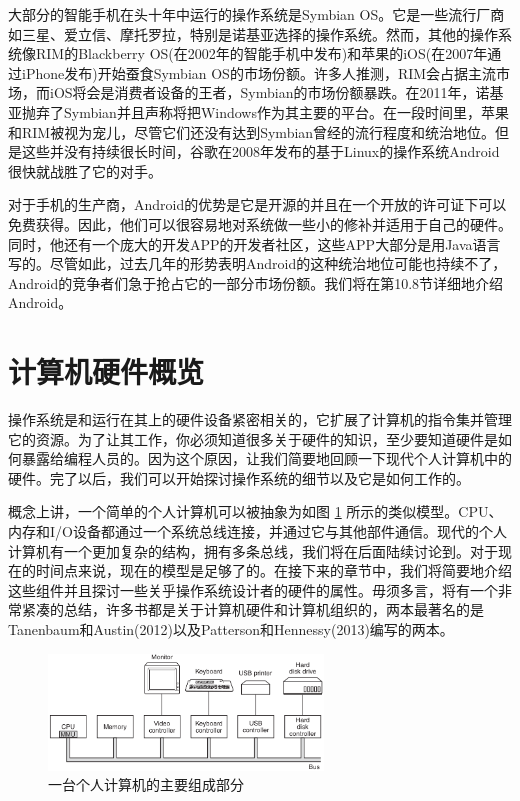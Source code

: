 	大部分的智能手机在头十年中运行的操作系统是Symbian OS。它是一些流行厂商如三星、爱立信、摩托罗拉，特别是诺基亚选择的操作系统。然而，其他的操作系统像RIM的Blackberry OS(在2002年的智能手机中发布)和苹果的iOS(在2007年通过iPhone发布)开始蚕食Symbian OS的市场份额。许多人推测，RIM会占据主流市场，而iOS将会是消费者设备的王者，Symbian的市场份额暴跌。在2011年，诺基亚抛弃了Symbian并且声称将把Windows作为其主要的平台。在一段时间里，苹果和RIM被视为宠儿，尽管它们还没有达到Symbian曾经的流行程度和统治地位。但是这些并没有持续很长时间，谷歌在2008年发布的基于Linux的操作系统Android很快就战胜了它的对手。
	
	对于手机的生产商，Android的优势是它是开源的并且在一个开放的许可证下可以免费获得。因此，他们可以很容易地对系统做一些小的修补并适用于自己的硬件。同时，他还有一个庞大的开发APP的开发者社区，这些APP大部分是用Java语言写的。尽管如此，过去几年的形势表明Android的这种统治地位可能也持续不了，Android的竞争者们急于抢占它的一部分市场份额。我们将在第10.8节详细地介绍Android。
	
\section{计算机硬件概览}

	操作系统是和运行在其上的硬件设备紧密相关的，它扩展了计算机的指令集并管理它的资源。为了让其工作，你必须知道很多关于硬件的知识，至少要知道硬件是如何暴露给编程人员的。因为这个原因，让我们简要地回顾一下现代个人计算机中的硬件。完了以后，我们可以开始探讨操作系统的细节以及它是如何工作的。
	
	概念上讲，一个简单的个人计算机可以被抽象为如图 \ref{fig:components} 所示的类似模型。CPU、内存和I/O设备都通过一个系统总线连接，并通过它与其他部件通信。现代的个人计算机有一个更加复杂的结构，拥有多条总线，我们将在后面陆续讨论到。对于现在的时间点来说，现在的模型是足够了的。在接下来的章节中，我们将简要地介绍这些组件并且探讨一些关乎操作系统设计者的硬件的属性。毋须多言，将有一个非常紧凑的总结，许多书都是关于计算机硬件和计算机组织的，两本最著名的是Tanenbaum和Austin(2012)以及Patterson和Hennessy(2013)编写的两本。
	
	\begin{figure}[ht]\small
		\centering
		\includegraphics[width=0.65\textwidth]{FIG/1-6.png}
		\caption{一台个人计算机的主要组成部分}\label{fig:components}
	\end{figure}

